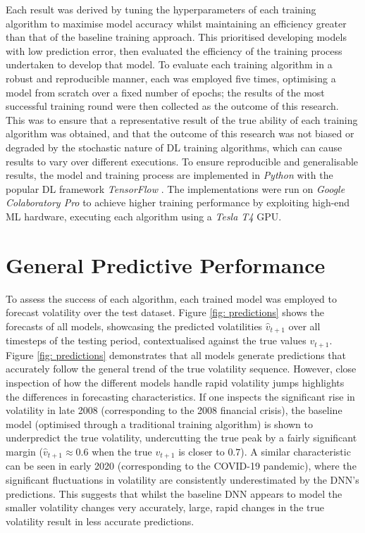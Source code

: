 \documentclass[a4paper, 11pt]{report}
\begin{document}
    Each result was derived by tuning the hyperparameters of each training algorithm to maximise model accuracy whilst maintaining an efficiency greater than that of the baseline training approach. This prioritised developing models with low prediction error, then evaluated the efficiency of the training process undertaken to develop that model. To evaluate each training algorithm in a robust and reproducible manner, each was employed five times, optimising a model from scratch over a fixed number of epochs; the results of the most successful training round were then collected as the outcome of this research. This was to ensure that a representative result of the true ability of each training algorithm was obtained, and that the outcome of this research was not biased or degraded by the stochastic nature of DL training algorithms, which can cause results to vary over different executions. To ensure reproducible and generalisable results, the model and training process are implemented in \emph{Python} with the popular DL framework \emph{TensorFlow} \citep{abadi-2016}. The implementations were run on \emph{Google Colaboratory Pro} to achieve higher training performance by exploiting high-end ML hardware, executing each algorithm using a \emph{Tesla T4} GPU. 

    \section{General Predictive Performance}

    To assess the success of each algorithm, each trained model was employed to forecast volatility over the test dataset. Figure \ref{fig: predictions} shows the forecasts of all models, showcasing the predicted volatilities $\hat{v}_{t+1}$ over all timesteps of the testing period, contextualised against the true values $v_{t+1}$. Figure \ref{fig: predictions} demonstrates that all models  generate predictions that accurately follow the general trend of the true volatility sequence. However, close inspection of how the different models handle rapid volatility jumps highlights the differences in forecasting characteristics. If one inspects the significant rise in volatility in late 2008 (corresponding to the 2008 financial crisis), the baseline model (optimised through a traditional training algorithm) is shown to underpredict the true volatility, undercutting the true peak by a fairly significant margin ($\hat{v}_{t+1} \approx 0.6$ when the true $v_{t+1}$ is closer to $0.7$). A similar characteristic can be seen in early 2020 (corresponding to the COVID-19 pandemic), where the significant fluctuations in volatility are consistently underestimated by the DNN's predictions. This suggests that whilst the baseline DNN appears to model the smaller volatility changes very accurately, large, rapid changes in the true volatility result in less accurate predictions. 
\end{document}
